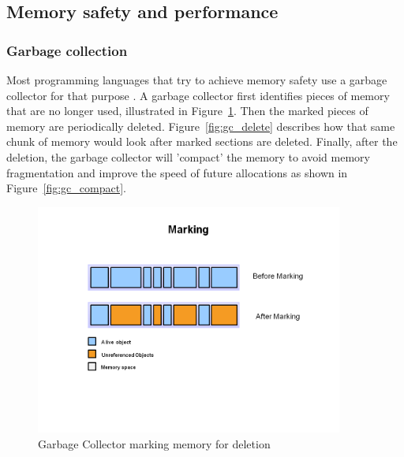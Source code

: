 \begin{minipage}{\textwidth}
\subsection{Memory safety and performance}

\subsubsection{Garbage collection}

Most programming languages that try to achieve memory safety use a garbage collector for that purpose \cite{java_garbage_collector}.
A garbage collector first identifies pieces of memory that are no longer used, illustrated in Figure~\ref{fig:gc_mark}.
Then the marked pieces of memory are periodically deleted. Figure~\ref{fig:gc_delete} describes how that same chunk of memory would look after marked sections are deleted.
Finally, after the deletion, the garbage collector will 'compact' the memory to avoid memory fragmentation and improve the speed of future allocations as shown in Figure~\ref{fig:gc_compact}.
\end{minipage}

\begin{figure}[htb]
    \centering
    \includegraphics[width=0.9\textwidth]{figures/fundamentals_garbage_collector_marking.PNG}
    \caption[Illustration: Garbage Collector marking memory for deletion \cite{java_garbage_collector}]{Garbage Collector marking memory for deletion}
    \label{fig:gc_mark}
\end{figure}

